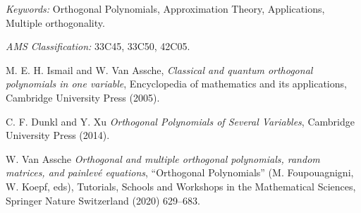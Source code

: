 \documentclass[11pt,a4paper]{amsart}
\begin{document}


\bigskip
\bigskip


\noindent
\textit{Keywords:} Orthogonal Polynomials, Approximation Theory, Applications, Multiple orthogonality.


\noindent
\textit{AMS Classification:}  33C45, 33C50, 42C05.








\begin{thebibliography}{99}

     M. E. H. Ismail and W. Van Assche,
     \emph{Classical and quantum orthogonal polynomials in one variable}, Encyclopedia of mathematics and its applications, Cambridge University Press (2005). 

     C. F. Dunkl and Y. Xu
     \emph{Orthogonal Polynomials of Several Variables}, Cambridge University Press (2014).


     W. Van Assche
     \emph{Orthogonal and multiple orthogonal polynomials, random matrices, and painlevé equations}, ``Orthogonal Polynomials'' (M. Foupouagnigni, W. Koepf, eds), Tutorials, Schools and Workshops in the Mathematical Sciences, Springer Nature Switzerland (2020) 629--683.
     
\end{thebibliography}
\end{document}
